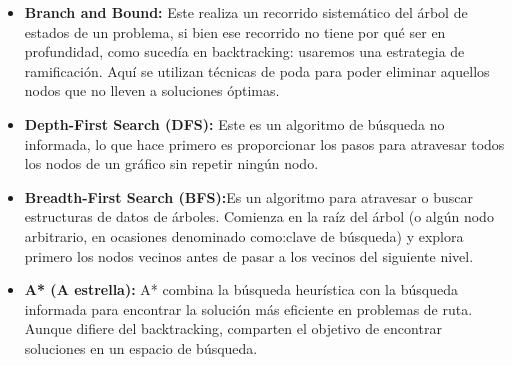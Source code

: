 \documentclass[a4paper,12pt]{article}
\begin{document}
\begin{itemize}
    \item \textbf{Branch and Bound:} Este realiza un recorrido sistemático del árbol de 
    estados de un problema, si bien ese recorrido no tiene por qué ser en profundidad, 
    como sucedía en backtracking: usaremos una estrategia de ramificación. 
    Aquí se utilizan técnicas de poda para poder eliminar aquellos nodos que no 
    lleven a soluciones óptimas.
    
    \item \textbf{Depth-First Search (DFS):} Este es un algoritmo de búsqueda no 
    informada, lo que hace primero es proporcionar los pasos para atravesar todos los 
    nodos de un gráfico sin repetir ningún nodo.
    
    \item \textbf{Breadth-First Search (BFS):}Es un algoritmo para atravesar o buscar 
    estructuras de datos de árboles. Comienza en la raíz del árbol (o algún nodo 
    arbitrario, en ocasiones denominado como:clave de búsqueda) y explora primero 
    los nodos vecinos antes de pasar a los vecinos del siguiente nivel.
    
    \item \textbf{A* (A estrella):} A* combina la búsqueda heurística con la búsqueda 
    informada para encontrar la solución más eficiente en problemas de ruta. Aunque 
    difiere del backtracking, comparten el objetivo de encontrar soluciones en un 
    espacio de búsqueda.
\end{itemize}


\end{document}

